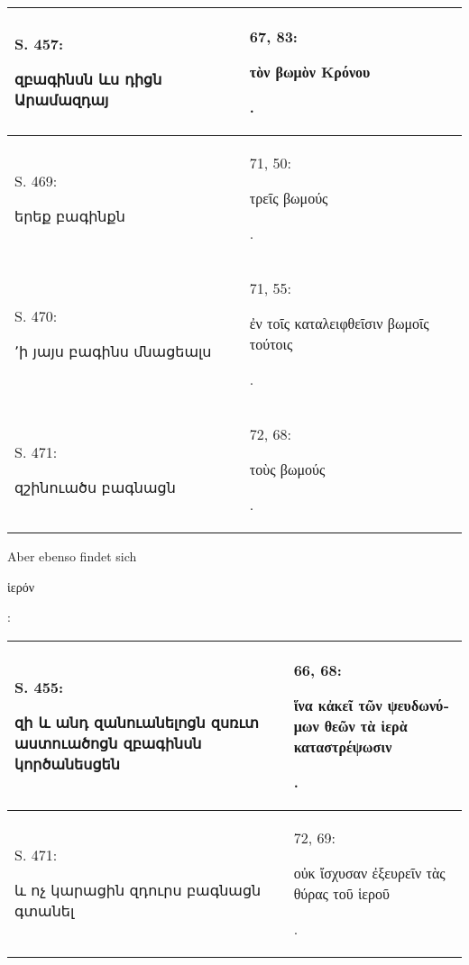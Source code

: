 \documentclass{article}
\begin{document}
{\begin{table}[H]
\begin{tabular}{p{45mm}|p{45mm}}
        S. 457: \begin{armenian}զբագինսն ևս դիցն Արամազդայ\end{armenian} & 67, 83: \begin{greek}τὸν βωμὸν Κρόνου\end{greek}.   \\ \hline
        S. 469: \begin{armenian}երեք բագինքն\end{armenian} & 71, 50: \begin{greek}τρεῖς βωμούς\end{greek}.   \\ \hline
        S. 470: \begin{armenian}՚ի յայս բագինս մնացեալս\end{armenian} & 71, 55: \begin{greek}ἐν τοῖς καταλειφθεῖσιν βωμοῖς τούτοις\end{greek}.   \\ \hline
        S. 471: \begin{armenian}զշինուածս բագնացն\end{armenian} & 72, 68: \begin{greek}τοὺς βωμούς\end{greek}. \\ \hline
    \end{tabular}
\end{table}
\hspace*{5mm}Aber ebenso findet sich \begin{greek}ἱερόν\end{greek}:  
\begin{table}[H]
    \centering
    \color{armeniaRed}
    \footnotesize
    \bfseries
    \begin{tabular}{p{45mm}|p{45mm}}
    \hline
        S. 455: \begin{armenian}զի և անդ զանուանելոցն զսռւտ աստուածոցն զբագինսն կործանեսցեն\end{armenian} & 66, 68: \begin{greek}ἵνα κἀκεῖ τῶν ψευδωνύμων θεῶν τὰ ἱερὰ καταστρέψωσιν\end{greek}.   \\ \hline
        S. 471: \begin{armenian}և ոչ կարացին զդուրս բագնացն գտանել\end{armenian} & 72, 69: \begin{greek}οὐκ ἴσχυσαν ἐξευρεῖν τὰς θύρας τοῦ ἱεροῦ\end{greek}. \\ \hline

\end{tabular}
\end{table}}
\end{document}
